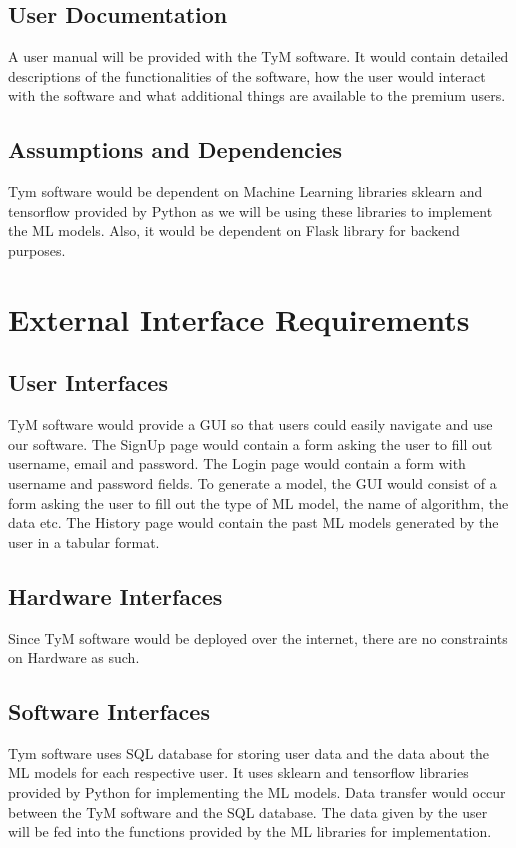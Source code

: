 \documentclass{scrreprt}
\begin{document}
\section{User Documentation}
A user manual will be provided with the TyM software. It would contain detailed descriptions of the functionalities of the software, how the user would interact with the software and what additional things are available to the premium users.

\section{Assumptions and Dependencies}
Tym software would be dependent on Machine Learning libraries sklearn and tensorflow provided by Python as we will be using these libraries to implement the ML models. Also, it would be dependent on Flask library for backend purposes.


\chapter{External Interface Requirements}

\section{User Interfaces}
TyM software would provide a GUI so that users could easily navigate and use our software. The SignUp page would contain a form asking the user to fill out username, email and password. The Login page would contain a form with username and password fields. To generate a model, the GUI would consist of a form asking the user to fill out the type of ML model, the name of algorithm, the data etc. The History page would contain the past ML models generated by the user in a tabular format. 

\section{Hardware Interfaces}
Since TyM software would be deployed over the internet, there are no constraints on Hardware as such.

\section{Software Interfaces}
Tym software uses SQL database for storing user data and the data about the ML models for each respective user. It uses sklearn and tensorflow libraries provided by Python for implementing the ML models. Data transfer would occur between the TyM software and the SQL database. The data given by the user will be fed into the functions provided by the ML libraries for implementation. 
\end{document}
